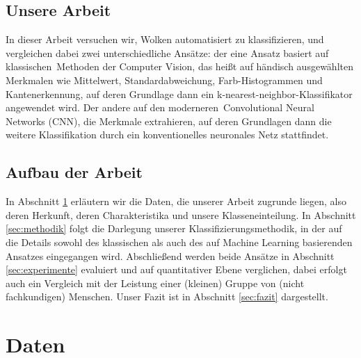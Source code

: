 \documentclass[a4,german]{article}
\begin{document}
\subsection{Unsere Arbeit}

In dieser Arbeit versuchen wir, Wolken automatisiert zu klassifizieren, und vergleichen dabei zwei unterschiedliche Ansätze:
der eine Ansatz basiert auf \glqq klassischen\grqq\ Methoden der Computer Vision, das heißt auf händisch ausgewählten Merkmalen wie Mittelwert, Standardabweichung, Farb-Histogrammen und Kantenerkennung, auf deren Grundlage dann ein k-nearest-neighbor-Klassifikator angewendet wird.
Der andere auf den \glqq moderneren\grqq\ Convolutional Neural Networks (CNN), die Merkmale extrahieren, auf deren Grundlagen dann die weitere Klassifikation durch ein konventionelles neuronales Netz stattfindet.


\subsection{Aufbau der Arbeit}

In Abschnitt \ref{sec:daten} erläutern wir die Daten, die unserer Arbeit zugrunde liegen, also deren Herkunft, deren Charakteristika und unsere Klasseneinteilung.
In Abschnitt \ref{sec:methodik} folgt die Darlegung unserer Klassifizierungsmethodik, in der auf die Details sowohl des klassischen als auch des auf Machine Learning basierenden Ansatzes eingegangen wird.
Abschließend werden beide Ansätze in Abschnitt \ref{sec:experimente} evaluiert und auf quantitativer Ebene verglichen, dabei erfolgt auch ein Vergleich mit der Leistung einer (kleinen) Gruppe von (nicht fachkundigen) Menschen.
Unser Fazit ist in Abschnitt \ref{sec:fazit} dargestellt.
 

\section{Daten}
\label{sec:daten}
\end{document}
